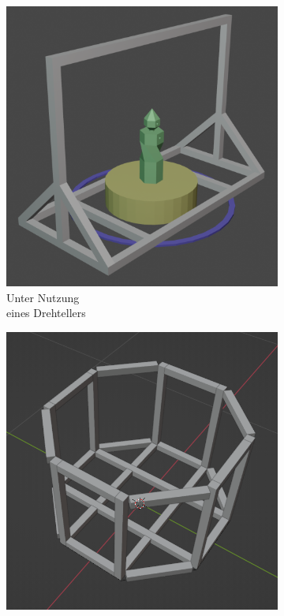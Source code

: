 \documentclass[./00PhotoBox.tex]{subfiles}
\begin{document}
\begin{figure}[htbp]
    \centering
    \begin{subfigure}{0.30\textwidth}
        \includegraphics[height=1\linewidth]{./img/3_aufbau/modell1.png}
        \centering
        \caption{Unter Nutzung\\eines Drehtellers}
        \label{img:entwurf1}
    \end{subfigure}
    \begin{subfigure}{0.30\textwidth}
        \includegraphics[height=1\linewidth]{./img/3_aufbau/modell2.png}

\end{subfigure}
\end{figure}
\end{document}
